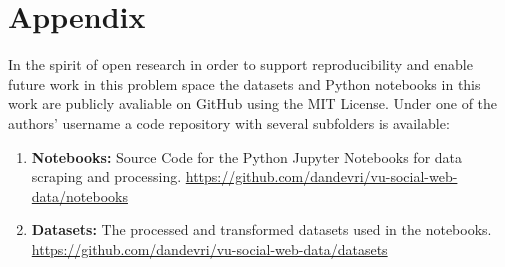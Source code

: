\section{Appendix}

In the spirit of open research in order to support reproducibility and enable future work in this problem space the datasets and Python notebooks in this work are publicly avaliable on GitHub using the MIT License. Under one of the authors' username a code repository with several subfolders is available:

\begin{enumerate}
  \item \textbf{Notebooks:} Source Code for the Python  Jupyter Notebooks for data scraping and processing. \underline{https://github.com/dandevri/vu-social-web-data/notebooks}
  \item \textbf{Datasets:} The processed and transformed datasets used in the notebooks. \\  \underline{{https://github.com/dandevri/vu-social-web-data/datasets}}
\end{enumerate}
